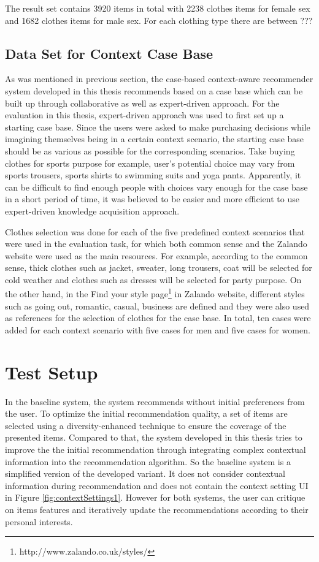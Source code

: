 The result set contains 3920 items in total with 2238 clothes items for female sex and 1682 clothes items for male sex. For each clothing type there are between  ???

\subsection{Data Set for Context Case Base} \label{sec:ds_ccb}

As was mentioned in previous section, the case-based context-aware recommender system developed in this thesis recommends based on a case base which can be built up through collaborative as well as expert-driven approach. For the evaluation in this thesis, expert-driven approach was used to first set up a starting case base. Since the users were asked to make purchasing decisions while imagining themselves being in a certain context scenario, the starting case base should be as various as possible for the corresponding scenarios. Take buying clothes for sports purpose for example, user's potential choice may vary from sports trousers, sports shirts to swimming suits and yoga pants. Apparently, it can be difficult to find enough people with choices vary enough for the case base in a short period of time, it was believed to be easier and more efficient to use expert-driven knowledge acquisition approach.

Clothes selection was done for each of the five predefined context scenarios that were used in the evaluation task, for which both common sense and the Zalando website were used as the main resources. For example, according to the common sense, thick clothes such as jacket, sweater, long trousers, coat will be selected for cold weather and clothes such as dresses will be selected for party purpose. On the other hand,  in the Find your style page\footnote{http://www.zalando.co.uk/styles/} in Zalando website, different styles such as going out, romantic, casual, business are defined and they were also used as references for the selection of clothes for the case base. In total, ten cases were added for each context scenario with five cases for men and five cases for women. 

\section{Test Setup} \label{sec:ts}

In the baseline system, the system recommends without initial preferences from the user. To optimize the initial recommendation quality,  a set of items are selected using a diversity-enhanced technique to ensure the coverage of the presented items. Compared to that, the system developed in this thesis tries to improve the the initial recommendation through integrating complex contextual information into the recommendation algorithm. So the baseline system is a simplified version of the developed variant. It does not consider contextual information during recommendation and does not contain the context setting UI in Figure \ref{fig:contextSettings1}. However for both systems, the user can critique on items features and iteratively update the recommendations according to their personal interests. 

